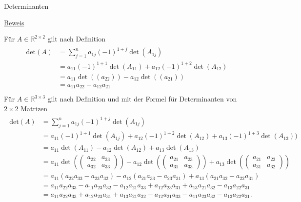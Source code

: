 \documentclass[
  8pt,
  ignorenonframetext,
]{beamer}
\begin{document}
\begin{frame}{Determinanten}
\protect\hypertarget{determinanten-2}{}
\scriptsize
{}

\underline{Beweis}

Für \(A \in \mathbb{R}^{2 \times 2}\) gilt nach Definition \begin{align}
\begin{split}
\mbox{det}(A)
& = \sum_{j = 1}^n a_{1j}(-1)^{1+j} \det\left(A_{1j}\right) \\
& = a_{11}(-1)^{1 + 1}\det(A_{11}) + a_{12}(-1)^{1 + 2}\det(A_{12}) \\
& = a_{11}\det((a_{22})) - a_{12}\det((a_{21})) \\
& = a_{11}a_{22} - a_{12}a_{21} \\
\end{split}
\end{align} Für \(A \in \mathbb{R}^{3 \times 3}\) gilt nach Definition
und mit der Formel für Determinanten von \(2 \times 2\) Matrizen
\begin{align}
\begin{split}
\mbox{det}(A)
& = \sum_{j = 1}^n a_{1j}(-1)^{1+j} \det\left(A_{1j}\right) \\
& =   a_{11}(-1)^{1+1} \det\left(A_{1j}\right) + a_{12}(-1)^{1+2} \det\left(A_{12}\right) +  a_{13}(-1)^{1+3} \det\left(A_{13}\right)) \\
& =   a_{11}\det(A_{11}) - a_{12}\det(A_{12}) + a_{13}\det(A_{13}) \\
& =   a_{11}\det\left(\begin{pmatrix} a_{22} & a_{23} \\ a_{32} & a_{33}\end{pmatrix} \right)
    - a_{12}\det\left(\begin{pmatrix} a_{21} & a_{23} \\ a_{31} & a_{33}\end{pmatrix} \right)
    + a_{13}\det\left(\begin{pmatrix} a_{21} & a_{22} \\ a_{31} & a_{32}\end{pmatrix} \right) \\
& =   a_{11}\left(a_{22}a_{33} - a_{23}a_{32} \right)
    - a_{12}\left(a_{21}a_{33} - a_{23}a_{31} \right)
    + a_{13}\left(a_{21}a_{32} - a_{22}a_{31} \right) \\
& =   a_{11}a_{22}a_{33} - a_{11}a_{23}a_{32}
    - a_{12}a_{21}a_{33} + a_{12}a_{23}a_{31}
    + a_{13}a_{21}a_{32} - a_{13}a_{22}a_{31} \\
& =   a_{11}a_{22}a_{33} + a_{12}a_{23}a_{31} + a_{13}a_{21}a_{32}
    - a_{12}a_{21}a_{33} - a_{11}a_{23}a_{32} - a_{13}a_{22}a_{31}.
\end{split}
\end{align}
\end{frame}
\end{document}

